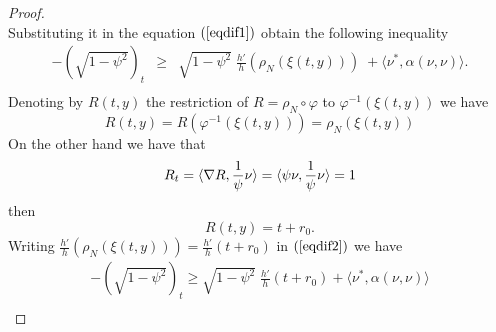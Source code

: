 \documentclass[a4paper]{amsart}
\theoremstyle{definition}
\numberwithin{equation}{section}
\begin{document}
\begin{proof}
\begin{equation}
\end{equation}
Substituting it in the equation $(\ref{eqdif1})$  obtain the
following inequality
\begin{equation}\label{eqdif2}
\begin{array}{ccl}
-(\sqrt{1 - \psi^2})_t &\geq& \sqrt{1 - \psi^2}\; \displaystyle \frac{h'}{h}(\rho_{N}(\xi(t,y)))\;+ \langle
\nu^*,\alpha(\nu,\nu)\rangle.\\
\end{array}
\end{equation}
Denoting  by $R(t,y)$  the restriction of $R=\rho_{N}\circ \varphi$ to $\varphi^{-1}(\xi(t,y))$ we have \[R(t,y)= R(\varphi^{-1}(\xi(t,y))) = \rho_{N}(\xi(t,y))\] On the other hand
we have that
\begin{equation}
R_t = \langle{\rm {\operatorname{\nabla}}} R,\frac{1}{\psi}\nu\rangle = \langle \psi
\nu, \frac{1}{\psi}\nu \rangle = 1
\end{equation}
then
\begin{equation}
R(t,y)= t + r_0.
\end{equation}
Writing  $\displaystyle \frac{h'}{h}(\rho_{N}(\xi(t,y))) = \displaystyle \frac{h'}{h}(t + r_0) $ in $(\ref{eqdif2})$ we have
\begin{equation}\label{eqdif3}
\begin{array}{ccl}
-(\sqrt{1 - \psi^2})_t \geq \sqrt{1 - \psi^2} \; \displaystyle\frac{h'}{h}(t + r_0) + \langle \nu^*,\alpha(\nu,\nu)\rangle\\


\end{array}
\end{equation}
\end{proof}
\end{document}
